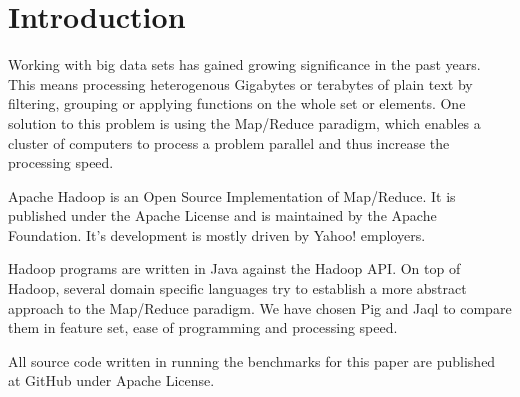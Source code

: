 \section{Introduction}

Working with big data sets has gained growing significance in the past years. This means processing heterogenous Gigabytes or terabytes of plain text by filtering, grouping or applying functions on the whole set or elements. One solution to this problem is using the Map/Reduce paradigm, which enables a cluster of computers to process a problem parallel and thus increase the processing speed.

Apache Hadoop is an Open Source Implementation of Map/Reduce. It is published under the Apache License and is maintained by the Apache Foundation. It's development is mostly driven by Yahoo! employers.

Hadoop programs are written in Java against the Hadoop API. On top of Hadoop, several domain specific languages try to establish a more abstract approach to the Map/Reduce paradigm. We have chosen Pig and Jaql to compare them in feature set, ease of programming and processing speed.

All source code written in running the benchmarks for this paper are published at GitHub under Apache License.
